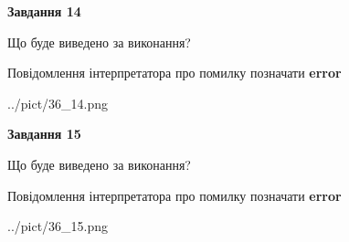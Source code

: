 \documentclass[11pt, ukrainian]{article}
\begin{document}
{\begin {large}
{\begin {center}\textbf{Завдання 14}\end {center}}\par
Що буде виведено за виконання? \par
Повідомлення інтерпретатора про помилку позначати \textbf{error}

\begin{center}
	{../pict/36_14.png}
\end{center}
\newpage

{\begin {center}\textbf{Завдання 15}\end {center}}\par
Що буде виведено за виконання? \par
Повідомлення інтерпретатора про помилку позначати \textbf{error}

\begin{center}
	{../pict/36_15.png}
\end{center}
\newpage

\end {large}}
\end{document}
